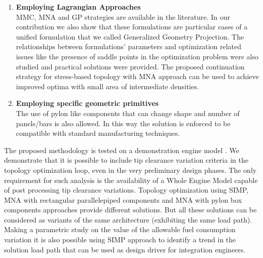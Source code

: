 \begin{enumerate}
	\item \textbf{Employing Lagrangian Approaches}\\
	MMC, MNA and GP strategies are available in the literature.  In our contribution we also show that these formulations are particular cases of a unified formulation that we called Generalized Geometry Projection. The relationships between formulations' parameters and optimization related issues like the presence of saddle points in the optimization problem were also studied and practical solutions were provided. The proposed continuation strategy for stress-based topology with MNA approach can be used to achieve improved optima with small area of intermediate densities. 
	\item \textbf{Employing specific geometric primitives}\\
	The use of pylon like components that can change shape and number of panels/bars is also allowed. In this way the solution is enforced to be compatible with standard manufacturing techniques. 
\end{enumerate}
The proposed methodology is tested on a demonstration engine model \cite{coniglio2019enginepylon}.
We demonstrate that it is possible to include tip clearance variation criteria in the topology optimization loop, even in the very preliminary design phases. The only requirement for such analysis is the availability of a Whole Engine Model capable of post processing tip clearance variations.
Topology optimization using SIMP, MNA with rectangular parallelepiped components and MNA with pylon box components approaches provide different solutions. But all these solutions can be considered as variants of the same architecture (exhibiting the same load path). Making a parametric study on the value of the allowable fuel consumption variation it is also possible using SIMP approach to identify a trend in the solution load path that can be used as design driver for integration engineers. 
